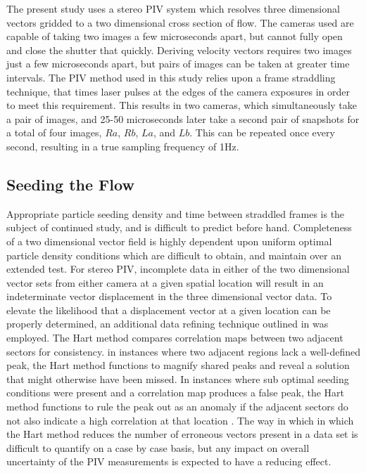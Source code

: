 The present study uses a stereo PIV system which resolves three dimensional 
vectors gridded to a two dimensional cross section of flow. The cameras used 
are capable of taking two images a few microseconds apart, 
but cannot fully open and close the shutter that quickly. Deriving velocity 
vectors requires two images just a few microseconds apart, but pairs of images 
can be taken at greater time intervals. The PIV method used in this study 
relies upon a frame straddling technique, that times laser pulses at the edges 
of the camera exposures in order to meet this requirement. This results in two 
cameras, which simultaneously take a pair of images, and 25-50 microseconds 
later take a second pair of snapshots for a total of four images, $Ra$, $Rb$, 
$La$, and $Lb$. This can be repeated once every second, resulting 
in a true sampling frequency of 1Hz.

\subsection{Seeding the Flow}

Appropriate particle seeding density and time between straddled frames is the
subject of continued study, and is difficult to predict before hand. 
Completeness of a two dimensional vector field is highly dependent upon 
uniform optimal particle density conditions which are difficult to obtain, and 
maintain over an extended test. For stereo PIV, incomplete data in either of 
the two dimensional vector 
sets from either camera at a given spatial location will result in an 
indeterminate vector displacement in the three dimensional vector data. To 
elevate the likelihood that a displacement vector at a given location can be 
properly determined, an additional data refining technique outlined in 
\cite{hart1998} was employed. The Hart method compares correlation maps 
between two adjacent sectors for consistency. in instances where two adjacent 
regions lack a well-defined peak, the Hart method functions to magnify shared 
peaks and reveal a solution that might otherwise have been missed. In instances 
where sub optimal seeding conditions were present and a correlation map 
produces a false peak, the Hart method functions to rule the peak out as an 
anomaly if the adjacent sectors do not also indicate a high correlation at that 
location \cite{hart1998}. The way in which in which the Hart method reduces the 
number of erroneous vectors present in a data set is difficult to quantify on a 
case by case basis, but any impact on overall uncertainty of the PIV 
measurements is expected to have a reducing effect.